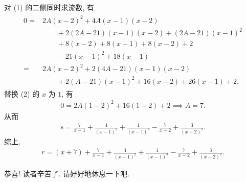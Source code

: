 \begin{example}
\begin{align*}
\begin{aligned}
        \end{aligned}
    \end{align*}
    对 (1) 的二侧同时求流数, 有
    \begin{align*}
        \tag*{(2)} \begin{aligned}
            0
            = {} & 2A (x - 2)^2 + 4A (x - 1)(x - 2)                            \\
                 & \qquad + 2(2A - 21) (x - 1) (x - 2) + (2A - 21) (x - 1)^2   \\
                 & \qquad + 8 (x - 2) + 8 (x - 1) + 8 (x - 2) + 2              \\
                 & \qquad - 21(x - 1)^2 + 18 (x - 1)                           \\
            = {} & 2A (x - 2)^2 + 2(4A - 21) (x - 1)(x - 2)                    \\
                 & \qquad + 2(A - 21) (x - 1)^2 + 16 (x - 2) + 26 (x - 1) + 2.
        \end{aligned}
    \end{align*}
    替换 (2) 的 $x$ 为 $1$, 有
    \begin{align*}
        0 = 2A (1 - 2)^2 + 16 (1 - 2) + 2 \implies A = 7.
    \end{align*}
    从而
    \begin{align*}
        s = \frac{7}{x - 1} + \frac{4}{(x - 1)^2} + \frac{1}{(x - 1)^3} - \frac{7}{x - 2} + \frac{3}{(x - 2)^2}.
    \end{align*}
    综上,
    \begin{align*}
        r = (x + 7) + \frac{7}{x - 1} + \frac{4}{(x - 1)^2} + \frac{1}{(x - 1)^3} - \frac{7}{x - 2} + \frac{3}{(x - 2)^2}.
    \end{align*}
\end{example}

恭喜! 读者辛苦了. 请好好地休息一下吧.

